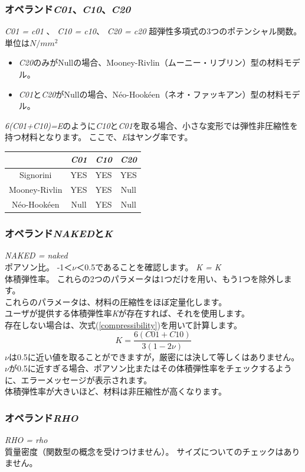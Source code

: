 \subsubsection{オペランド\textit{C01}、\textit{C10}、\textit{C20}}
\textit{C01 = c01} 、\textit{ C10 = c10}、 \textit{C20 = c20}
超弾性多項式の3つのポテンシャル関数。\\
単位は$N/mm^{2}$
\begin{itemize}
	\item \textit{C20}のみがNullの場合、Mooney-Rivlin（ムーニー・リブリン）型の材料モデル。
	\item \textit{C01}と\textit{C20}がNullの場合、Néo-Hookéen（ネオ・ファッキアン）型の材料モデル。
\end{itemize}
\textit{6(C01+C10)=E}のように\textit{C10}と\textit{C01}を取る場合、小さな変形では弾性非圧縮性を持つ材料となります。
ここで、\textit{E}はヤング率です。
\vspace{\baselineskip}
\begin{table}[H]
	\centering
	\begin{tabular}{@{}cccc@{}}
		\toprule
		              & \textit{C01} & \textit{C10} & \textit{C20} \\ \midrule
		Signorini     & YES          & YES          & YES          \\
		Mooney-Rivlin & YES          & YES          & Null         \\
		Néo-Hookéen   & Null         & YES          & Null         \\ \bottomrule
	\end{tabular}
\end{table}
\clearpage
\subsubsection{オペランド\textit{NAKED}と\textit{K}}
\textit{NAKED = naked}\\
ポアソン比。
-1＜$\nu$＜0.5であることを確認します。
\textit{K = K}\\
体積弾性率。
これらの2つのパラメータは1つだけを用い、もう1つを除外します。\\
これらのパラメータは、材料の圧縮性をほぼ定量化します。\\
ユーザが提供する体積弾性率\textit{K}が存在すれば、それを使用します。\\
存在しない場合は、次式(\ref{compressibility})を用いて計算します。
\begin{equation}
	\label{compressibility}
	K=\frac{6(C01+C10)}{3(1-2\nu)}
\end{equation}
$\nu$は0.5に近い値を取ることができますが，厳密には決して等しくはありません。\\
$\nu$が0.5に近すぎる場合、ポアソン比またはその体積弾性率をチェックするように、エラーメッセージが表示されます。\\
体積弾性率が大きいほど、材料は非圧縮性が高くなります。
\subsubsection{オペランド\textit{RHO}}
\textit{RHO = rho}\\
質量密度（関数型の概念を受けつけません）。
サイズについてのチェックはありません。